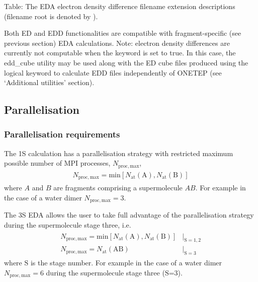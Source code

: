 \documentclass[letterpaper,10pt,english]{sphinxmanual}
\begin{document}
Table: The EDA electron density difference filename extension
descriptions (filename root is denoted by ).

Both ED and EDD functionalities are compatible with fragment-specific
(see previous section) EDA calculations.
Note: electron density differences are currently not computable when the
 keyword is set to true. In this case, the edd\_cube
utility may be used along with the ED cube files produced using the
 logical keyword to calculate EDD files
independently of ONETEP (see ‘Additional utilities’ section).


\subsection{Parallelisation}
\label{\detokenize{EDA:parallelisation}}

\subsubsection{Parallelisation requirements}
\label{\detokenize{EDA:parallelisation-requirements}}
The 1S calculation has a parallelisation strategy with restricted
maximum possible number of MPI processes, \({N_\mathrm{proc,max}}\),
\begin{equation*}
\begin{split}\begin{aligned}
  {N_\mathrm{proc,max}}= \mathrm{min}\left[ {N_\mathrm{at}(\mathrm{A})}, {N_\mathrm{at}(\mathrm{B})} \right]\end{aligned}\end{split}
\end{equation*}
where \(A\) and \(B\) are fragments comprising a supermolecule
\(AB\). For example in the case of a water dimer
\({N_\mathrm{proc,max}}= 3\).

The 3S EDA allows the user to take full advantage of the parallelisation
strategy during the supermolecule stage three, i.e.
\begin{equation*}
\begin{split}\begin{aligned}
 {N_\mathrm{proc,max}}= \mathrm{min}\left[ {N_\mathrm{at}(\mathrm{A})}, {N_\mathrm{at}(\mathrm{B})} \right] &|_{{\mathrm{S}}=1,2} \\
 {N_\mathrm{proc,max}}= {N_\mathrm{at}(\mathrm{AB})} &|_{{\mathrm{S}}=3}\end{aligned}\end{split}
\end{equation*}
where \({\mathrm{S}}\) is the stage number. For example in the case
of a water dimer \({N_\mathrm{proc,max}}= 6\) during the
supermolecule stage three (\({\mathrm{S}}\)=3).
\end{document}

